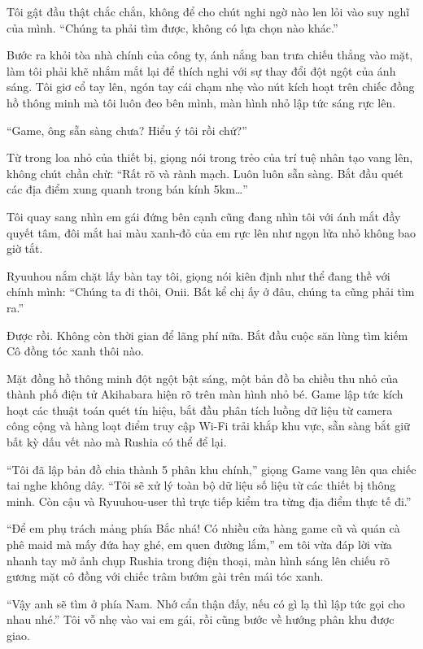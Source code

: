 \documentclass[../main.tex]{subfiles}
\begin{document}
Tôi gật đầu thật chắc chắn, không để cho chút nghi ngờ nào len lỏi vào suy nghĩ của mình. ``Chúng ta phải tìm được, không có lựa chọn nào khác.''

Bước ra khỏi tòa nhà chính của công ty, ánh nắng ban trưa chiếu thẳng vào mặt, làm tôi phải khẽ nhắm mắt lại để thích nghi với sự thay đổi đột ngột của ánh sáng. Tôi giơ cổ tay lên, ngón tay cái chạm nhẹ vào nút kích hoạt trên chiếc đồng hồ thông minh mà tôi luôn đeo bên mình, màn hình nhỏ lập tức sáng rực lên.

``Game, ông sẵn sàng chưa? Hiểu ý tôi rồi chứ?''

Từ trong loa nhỏ của thiết bị, giọng nói trong trẻo của trí tuệ nhân tạo vang lên, không chút chần chừ: ``Rất rõ và rành mạch. Luôn luôn sẵn sàng. Bắt đầu quét các địa điểm xung quanh trong bán kính 5km\dots''

Tôi quay sang nhìn em gái đứng bên cạnh cũng đang nhìn tôi với ánh mắt đầy quyết tâm, đôi mắt hai màu xanh-đỏ của em rực lên như ngọn lửa nhỏ không bao giờ tắt.

Ryuuhou nắm chặt lấy bàn tay tôi, giọng nói kiên định như thể đang thề với chính mình: ``Chúng ta đi thôi, Onii. Bất kể chị ấy ở đâu, chúng ta cũng phải tìm ra.''

Được rồi. Không còn thời gian để lãng phí nữa. Bắt đầu cuộc săn lùng tìm kiếm Cô đồng tóc xanh thôi nào.

\ct

Mặt đồng hồ thông minh đột ngột bật sáng, một bản đồ ba chiều thu nhỏ của thành phố điện tử Akihabara hiện rõ trên màn hình nhỏ bé. Game lập tức kích hoạt các thuật toán quét tín hiệu, bắt đầu phân tích luồng dữ liệu từ camera công cộng và hàng loạt điểm truy cập Wi-Fi trải khắp khu vực, sẵn sàng bắt giữ bất kỳ dấu vết nào mà Rushia có thể để lại.

``Tôi đã lập bản đồ chia thành 5 phân khu chính,'' giọng Game vang lên qua chiếc tai nghe không dây. ``Tôi sẽ xử lý toàn bộ dữ liệu số liệu từ các thiết bị thông minh. Còn cậu và Ryuuhou-user thì trực tiếp kiểm tra từng địa điểm thực tế đi.''

``Để em phụ trách mảng phía Bắc nhá! Có nhiều cửa hàng game cũ và quán cà phê maid mà mấy đứa hay ghé, em quen đường lắm,'' em tôi vừa đáp lời vừa nhanh tay mở ảnh chụp Rushia trong điện thoại, màn hình sáng lên chiếu rõ gương mặt cô đồng với chiếc trâm bướm gài trên mái tóc xanh.

``Vậy anh sẽ tìm ở phía Nam. Nhớ cẩn thận đấy, nếu có gì lạ thì lập tức gọi cho nhau nhé.'' Tôi vỗ nhẹ vào vai em gái, rồi cũng bước về hướng phân khu được giao.
\end{document}
